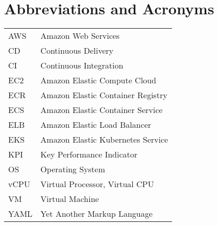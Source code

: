 \pagestyle{empty}

\null\vfill
\chapter*{Abbreviations and Acronyms}
    \begin{tabular}{ll}
        AWS & Amazon Web Services \\
        CD & Continuous Delivery \\
        CI & Continuous Integration \\
        EC2 & Amazon Elastic Compute Cloud \\
        ECR & Amazon Elastic Container Registry \\
        ECS & Amazon Elastic Container Service \\
        ELB & Amazon Elastic Load Balancer \\
        EKS & Amazon Elastic Kubernetes Service \\
        KPI & Key Performance Indicator \\
        OS & Operating System \\
        vCPU & Virtual Processor, Virtual CPU \\
        VM & Virtual Machine \\
        YAML & Yet Another Markup Language \\
\end{tabular}

\vspace{10cm}

\clearpage

